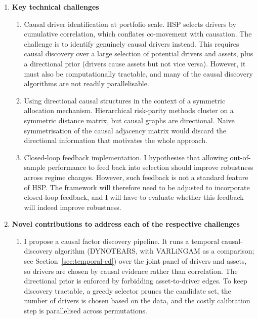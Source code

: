\documentclass[12pt, a4paper]{report}
\begin{document}
\begin{enumerate}
    \item \textbf{Key technical challenges}
    \begin{enumerate}[label=\textbf{C\arabic*}]
        \item Causal driver identification at portfolio scale. HSP selects drivers by
            cumulative correlation, which conflates co-movement with causation.
            The challenge is to identify genuinely causal drivers instead. 
            This requires causal discovery over a large selection of potential drivers and assets, plus a directional
            prior (drivers cause assets but not vice versa). 
            However, it must also be computationally tractable, and many of the causal discovery algorithms are not readily parallelisable.
            
        \item Using directional causal structures in the context of a symmetric allocation mechanism.
            Hierarchical risk-parity methods cluster on a symmetric distance matrix, but causal
            graphs are directional. Naive symmetrisation of the causal adjacency matrix would discard the directional information that motivates the
            whole approach.
            
        \item Closed-loop feedback implementation.
            I hypothesise that allowing out-of-sample
            performance to feed back into selection should improve robustness across regime changes.
            However, such feedback is not a standard feature of HSP.
            The framework will therefore need to be adjusted to incorporate closed-loop feedback, and I will have to evaluate whether this feedback will indeed improve robustness.
            
    \end{enumerate}

    \item \textbf{Novel contributions to address each of the respective challenges}
    \begin{enumerate}[label=\textbf{A\arabic*}]
        \item I propose a causal factor discovery pipeline. It runs a temporal
              causal-discovery algorithm (DYNOTEARS, with VARLiNGAM as a comparison; see
              Section~\ref{sec:temporal-cd}) over the joint panel of drivers and assets, so drivers
              are chosen by causal evidence rather than correlation. The directional prior is
              enforced by forbidding asset-to-driver edges. To keep discovery tractable, a
              greedy selector prunes the candidate set, the number of drivers is chosen
              based on the data, and the costly calibration step is parallelised across permutations.


\end{enumerate}
\end{enumerate}
\end{document}
